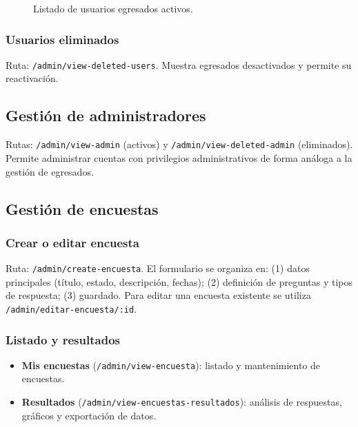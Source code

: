 \begin{figure}[H]
\centering
{}
\caption{Listado de usuarios egresados activos.}
\label{fig:usuarios-activos}
\end{figure}

\subsubsection{Usuarios eliminados}

Ruta: \texttt{/admin/view-deleted-users}. Muestra egresados desactivados y permite su reactivación.

\subsection{Gestión de administradores}

Rutas: \texttt{/admin/view-admin} (activos) y \texttt{/admin/view-deleted-admin} (eliminados). Permite administrar cuentas con privilegios administrativos de forma análoga a la gestión de egresados.

\subsection{Gestión de encuestas}

\subsubsection{Crear o editar encuesta}

Ruta: \texttt{/admin/create-encuesta}. El formulario se organiza en: (1) datos principales (título, estado, descripción, fechas); (2) definición de preguntas y tipos de respuesta; (3) guardado. Para editar una encuesta existente se utiliza \texttt{/admin/editar-encuesta/:id}.

\subsubsection{Listado y resultados}

\begin{itemize}
\item \textbf{Mis encuestas} (\texttt{/admin/view-encuesta}): listado y mantenimiento de encuestas.
\item \textbf{Resultados} (\texttt{/admin/view-encuestas-resultados}): análisis de respuestas, gráficos y exportación de datos.
\end{itemize}

